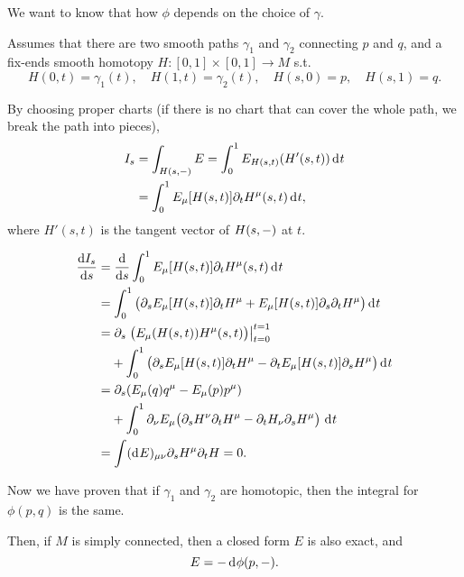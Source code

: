 \documentclass[openany, oneside, a5paper]{book}
\begin{document}
We want to know that how $\phi$ depends on the choice of $\gamma$.


Assumes that there are two smooth paths $\gamma_1$ and $\gamma_2$ connecting $p$ and $q$,
and a fix-ends smooth homotopy $H \colon [0, 1] \times [0, 1] \to M$ s.t.\ 
\begin{equation}
    H(0, t) = \gamma_1(t),
    \quad
    H(1, t) = \gamma_2(t),
    \quad
    H(s, 0) = p,
    \quad
    H(s, 1) = q.
\end{equation}

By choosing proper charts (if there is no chart that can cover the whole path, we break the path into pieces),
\begin{align}
    I_s 
    &= \int_{H(s, -)} E 
    = \int_0^1 E_{H(s, t)}(H'(s, t)) \mathop{}\!\mathrm{d}^{} t
    \\
    &= \int_0^1 E_\mu [H(s, t)] \partial_t H^\mu(s, t) \mathop{}\!\mathrm{d}^{} t,
\end{align}
where $H'(s, t)$ is the tangent vector of $H(s, -)$ at $t$.

\begin{align}
    \diff{I_s}{s}
    &= \diff{} s \int_0^1 E_\mu [H(s, t)] \partial_t H^\mu(s, t) \dif t
    \\
    &= \int_0^1 \big(
        \partial_s E_\mu [H(s, t)] \partial_t H^\mu
        +
        E_\mu [H(s, t)] \partial_s\partial_t H^\mu
    \big) 
    \dif t
    \\
    &= \partial_s \left.\big(
      E_\mu(H(s, t)) H^\mu(s, t)  
    \big)\right|^{t = 1}_{t=0}
    \\
    &\phantom{= {}}
    + \int_0^1 \big(
        \partial_s E_\mu [H(s, t)] \partial_t H^\mu
        -
        \partial_t E_\mu [H(s, t)] \partial_s H^\mu
    \big) 
    \dif t
    \\
    &=
    \partial_s (E_\mu(q) q^\mu - E_\mu(p) p^\mu)
    \\
    &\phantom{= {}} 
    + \int_0^1 \partial_\nu E_\mu \big(
        \partial_s H^\nu  \partial_t H^\mu
        -
        \partial_t H_\nu \partial_s H^\mu
    \big) \,\dif t
    \\
    &= \int (\dif E)_{\mu\nu} \partial_s H^\mu \partial_t H
    = 0.
\end{align}

Now we have proven that if $\gamma_1$ and $\gamma_2$ are homotopic, then the integral for $\phi(p, q)$ is the same.

Then, if $M$ is simply connected, then a closed form $E$ is also exact, and
\begin{equation}
    E = - \mathop{}\!\mathrm{d}^{} \phi(p, -).
\end{equation}
\end{document}
